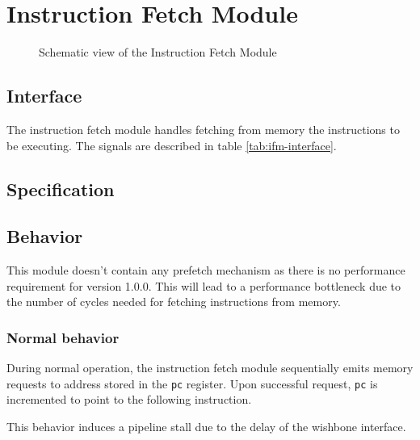 \section{Instruction Fetch Module}

\begin{figure}[h!]
    \centering
    
    \caption{Schematic view of the Instruction Fetch Module}
    \label{fig:ifm}
\end{figure}

\subsection{Interface}

\begin{content}
The instruction fetch module handles fetching from memory the instructions to be executing. The signals are described in table \ref{tab:ifm-interface}. 
\end{content}



\subsection{Specification}

\subsection{Behavior}

\begin{content}
  This module doesn't contain any prefetch mechanism as there is no performance requirement for version 1.0.0. This will lead to a performance bottleneck due to the number of cycles needed for fetching instructions from memory.
\end{content}

\subsubsection{Normal behavior}

\begin{content}
  During normal operation, the instruction fetch module sequentially emits memory requests to address stored in the \texttt{pc} register. Upon successful request, \texttt{pc} is incremented to point to the following instruction.

  This behavior induces a pipeline stall due to the delay of the wishbone interface.
\end{content}

